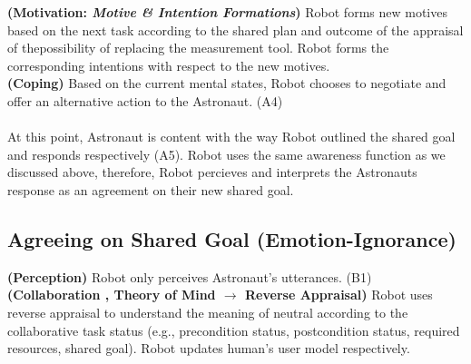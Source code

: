 \noindent\textbf{(Motivation: \textit{Motive \& Intention Formations})} Robot
forms new motives based on the next task according to the shared plan and
outcome of the appraisal of thepossibility of replacing the measurement tool.
Robot forms the corresponding intentions with respect to the new motives.\\

\noindent\textbf{(Coping)} Based on the current mental states, Robot
chooses to negotiate and offer an alternative action to the Astronaut. (A4)\\

\noindent{}\\

At this point, Astronaut is content with the way Robot outlined the shared goal
and responds respectively (A5). Robot uses the same awareness function as we
discussed above, therefore, Robot percieves and interprets the Astronauts
response as an agreement on their new shared goal.\\

\noindent{}

\subsection{Agreeing on Shared Goal (Emotion-Ignorance)}
\label{sec:wt-exp2}

\noindent{}

\noindent\textbf{(Perception)} Robot only perceives Astronaut's utterances.
(B1)\\

\noindent\textbf{(Collaboration , Theory of Mind $\rightarrow$ Reverse
Appraisal)} Robot uses reverse appraisal to understand the meaning of neutral
according to the collaborative task status (e.g., precondition status,
postcondition status, required resources, shared goal). Robot updates human's
user model respectively.\\

